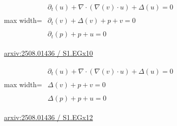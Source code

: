 \documentclass[10pt,a4paper]{article}
\begin{document}
\begin{minipage}{\linewidth}
\begin{center}\begin{adjustbox}{max width=\linewidth}$\displaystyle\begin{gathered}\begin{gathered}\partial_{t}(u)+\nabla\cdot(\nabla(v)\cdot u)+\Delta(u)=0\end{gathered}\\[5pt]\begin{gathered}\partial_{t}(v)+\Delta(v)+p+v=0\end{gathered}\\[5pt]\begin{gathered}\partial_{t}(p)+p+u=0\end{gathered}\end{gathered}$\end{adjustbox}\end{center}
{\small \href{https://arxiv.org/html/2508.01436#S1.EGx10}{arxiv:2508.01436 / S1.EGx10}}\par
\end{minipage}\par\vspace{7mm}

\begin{minipage}{\linewidth}
\begin{center}\begin{adjustbox}{max width=\linewidth}$\displaystyle\begin{gathered}\begin{gathered}\partial_{t}(u)+\nabla\cdot(\nabla(v)\cdot u)+\Delta(u)=0\end{gathered}\\[5pt]\begin{gathered}\Delta(v)+p+v=0\end{gathered}\\[5pt]\begin{gathered}\Delta(p)+p+u=0\end{gathered}\end{gathered}$\end{adjustbox}\end{center}
{\small \href{https://arxiv.org/html/2508.01436#S1.EGx12}{arxiv:2508.01436 / S1.EGx12}}\par
\end{minipage}\par\vspace{7mm}
\end{document}
